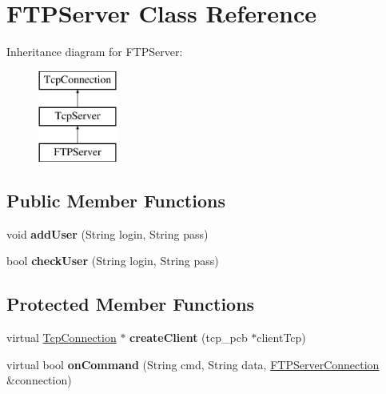 \hypertarget{class_f_t_p_server}{}\section{F\+T\+P\+Server Class Reference}
\label{class_f_t_p_server}
Inheritance diagram for F\+T\+P\+Server\+:\begin{figure}[H]
\begin{center}
\leavevmode
\includegraphics[height=3.000000cm]{class_f_t_p_server}
\end{center}
\end{figure}
\subsection*{Public Member Functions}
\begin{DoxyCompactItemize}
\item 
\hypertarget{class_f_t_p_server_adddb840204f296775d059075c440d9f9}{}void {\bfseries add\+User} (String login, String pass)\label{class_f_t_p_server_adddb840204f296775d059075c440d9f9}

\item 
\hypertarget{class_f_t_p_server_a427ae5840b2491164bb3e92099ee469e}{}bool {\bfseries check\+User} (String login, String pass)\label{class_f_t_p_server_a427ae5840b2491164bb3e92099ee469e}

\end{DoxyCompactItemize}
\subsection*{Protected Member Functions}
\begin{DoxyCompactItemize}
\item 
\hypertarget{class_f_t_p_server_a092faf3fadd29a175b7df817a1919099}{}virtual \hyperlink{class_tcp_connection}{Tcp\+Connection} $\ast$ {\bfseries create\+Client} (tcp\+\_\+pcb $\ast$client\+Tcp)\label{class_f_t_p_server_a092faf3fadd29a175b7df817a1919099}

\item 
\hypertarget{class_f_t_p_server_afd4dd8a2a6f63cec55aeeac0fbc1a4ac}{}virtual bool {\bfseries on\+Command} (String cmd, String data, \hyperlink{class_f_t_p_server_connection}{F\+T\+P\+Server\+Connection} \&connection)\label{class_f_t_p_server_afd4dd8a2a6f63cec55aeeac0fbc1a4ac}

\end{DoxyCompactItemize}
